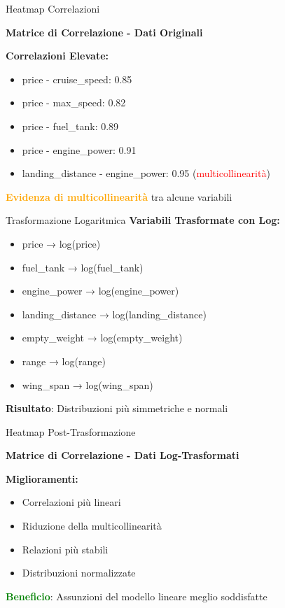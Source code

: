 \documentclass{beamer}
\begin{document}
\begin{frame}{Heatmap Correlazioni}
\begin{center}
\textbf{Matrice di Correlazione - Dati Originali}
\end{center}

\textbf{Correlazioni Elevate:}
\begin{itemize}
    \item price - cruise\_speed: 0.85
    \item price - max\_speed: 0.82
    \item price - fuel\_tank: 0.89
    \item price - engine\_power: 0.91
    \item landing\_distance - engine\_power: 0.95 (\textcolor{red}{multicollinearità})
\end{itemize}

\vspace{0.5cm}
\textcolor{orange}{\textbf{Evidenza di multicollinearità}} tra alcune variabili
\end{frame}

\begin{frame}{Trasformazione Logaritmica}
\textbf{Variabili Trasformate con Log:}
\begin{itemize}
    \item price → log(price)
    \item fuel\_tank → log(fuel\_tank)
    \item engine\_power → log(engine\_power)
    \item landing\_distance → log(landing\_distance)
    \item empty\_weight → log(empty\_weight)
    \item range → log(range)
    \item wing\_span → log(wing\_span)
\end{itemize}

\vspace{0.5cm}
\textbf{Risultato}: Distribuzioni più simmetriche e normali
\end{frame}

\begin{frame}{Heatmap Post-Trasformazione}
\begin{center}
\textbf{Matrice di Correlazione - Dati Log-Trasformati}
\end{center}

\textbf{Miglioramenti:}
\begin{itemize}
    \item Correlazioni più lineari
    \item Riduzione della multicollinearità
    \item Relazioni più stabili
    \item Distribuzioni normalizzate
\end{itemize}

\vspace{0.5cm}
\textcolor{green}{\textbf{Beneficio}}: Assunzioni del modello lineare meglio soddisfatte
\end{frame}
\end{document}
